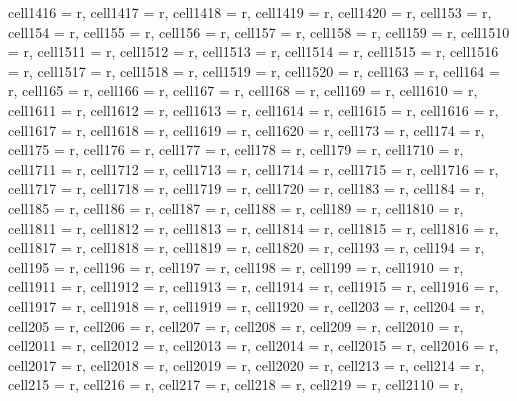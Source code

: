 \documentclass[journal]{IEEEtran}
\begin{document}
\begin{table}
\begin{adjustbox}{width=\textwidth}
\begin{tblr}
{  cell{14}{16} = {r},
  cell{14}{17} = {r},
  cell{14}{18} = {r},
  cell{14}{19} = {r},
  cell{14}{20} = {r},
  cell{15}{3} = {r},
  cell{15}{4} = {r},
  cell{15}{5} = {r},
  cell{15}{6} = {r},
  cell{15}{7} = {r},
  cell{15}{8} = {r},
  cell{15}{9} = {r},
  cell{15}{10} = {r},
  cell{15}{11} = {r},
  cell{15}{12} = {r},
  cell{15}{13} = {r},
  cell{15}{14} = {r},
  cell{15}{15} = {r},
  cell{15}{16} = {r},
  cell{15}{17} = {r},
  cell{15}{18} = {r},
  cell{15}{19} = {r},
  cell{15}{20} = {r},
  cell{16}{3} = {r},
  cell{16}{4} = {r},
  cell{16}{5} = {r},
  cell{16}{6} = {r},
  cell{16}{7} = {r},
  cell{16}{8} = {r},
  cell{16}{9} = {r},
  cell{16}{10} = {r},
  cell{16}{11} = {r},
  cell{16}{12} = {r},
  cell{16}{13} = {r},
  cell{16}{14} = {r},
  cell{16}{15} = {r},
  cell{16}{16} = {r},
  cell{16}{17} = {r},
  cell{16}{18} = {r},
  cell{16}{19} = {r},
  cell{16}{20} = {r},
  cell{17}{3} = {r},
  cell{17}{4} = {r},
  cell{17}{5} = {r},
  cell{17}{6} = {r},
  cell{17}{7} = {r},
  cell{17}{8} = {r},
  cell{17}{9} = {r},
  cell{17}{10} = {r},
  cell{17}{11} = {r},
  cell{17}{12} = {r},
  cell{17}{13} = {r},
  cell{17}{14} = {r},
  cell{17}{15} = {r},
  cell{17}{16} = {r},
  cell{17}{17} = {r},
  cell{17}{18} = {r},
  cell{17}{19} = {r},
  cell{17}{20} = {r},
  cell{18}{3} = {r},
  cell{18}{4} = {r},
  cell{18}{5} = {r},
  cell{18}{6} = {r},
  cell{18}{7} = {r},
  cell{18}{8} = {r},
  cell{18}{9} = {r},
  cell{18}{10} = {r},
  cell{18}{11} = {r},
  cell{18}{12} = {r},
  cell{18}{13} = {r},
  cell{18}{14} = {r},
  cell{18}{15} = {r},
  cell{18}{16} = {r},
  cell{18}{17} = {r},
  cell{18}{18} = {r},
  cell{18}{19} = {r},
  cell{18}{20} = {r},
  cell{19}{3} = {r},
  cell{19}{4} = {r},
  cell{19}{5} = {r},
  cell{19}{6} = {r},
  cell{19}{7} = {r},
  cell{19}{8} = {r},
  cell{19}{9} = {r},
  cell{19}{10} = {r},
  cell{19}{11} = {r},
  cell{19}{12} = {r},
  cell{19}{13} = {r},
  cell{19}{14} = {r},
  cell{19}{15} = {r},
  cell{19}{16} = {r},
  cell{19}{17} = {r},
  cell{19}{18} = {r},
  cell{19}{19} = {r},
  cell{19}{20} = {r},
  cell{20}{3} = {r},
  cell{20}{4} = {r},
  cell{20}{5} = {r},
  cell{20}{6} = {r},
  cell{20}{7} = {r},
  cell{20}{8} = {r},
  cell{20}{9} = {r},
  cell{20}{10} = {r},
  cell{20}{11} = {r},
  cell{20}{12} = {r},
  cell{20}{13} = {r},
  cell{20}{14} = {r},
  cell{20}{15} = {r},
  cell{20}{16} = {r},
  cell{20}{17} = {r},
  cell{20}{18} = {r},
  cell{20}{19} = {r},
  cell{20}{20} = {r},
  cell{21}{3} = {r},
  cell{21}{4} = {r},
  cell{21}{5} = {r},
  cell{21}{6} = {r},
  cell{21}{7} = {r},
  cell{21}{8} = {r},
  cell{21}{9} = {r},
  cell{21}{10} = {r},
}
\end{tblr}
\end{adjustbox}
\end{table}
\end{document}
